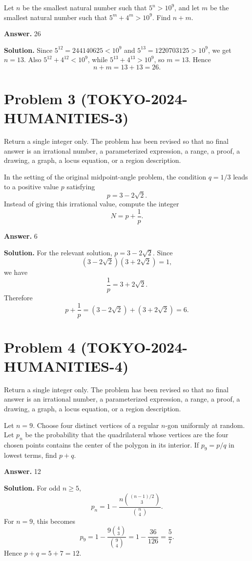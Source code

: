 \documentclass[11pt]{article}
\begin{document}
Let \(n\) be the smallest natural number such that \(5^n>10^9\), and let \(m\)
be the smallest natural number such that \(5^m+4^m>10^9\). Find \(n+m\).


\textbf{Answer.} 26


\textbf{Solution.}
Since \(5^{12}=244140625<10^9\) and \(5^{13}=1220703125>10^9\), we get
\(n=13\). Also \(5^{12}+4^{12}<10^9\), while \(5^{13}+4^{13}>10^9\), so
\(m=13\). Hence
\[
n+m=13+13=26.
\]


\section*{Problem 3 (TOKYO-2024-HUMANITIES-3)}

Return a single integer only. The problem has been revised so that no final answer is an irrational number, a parameterized expression, a range, a proof, a drawing, a graph, a locus equation, or a region description.

In the setting of the original midpoint-angle problem, the condition \(q=1/3\)
leads to a positive value \(p\) satisfying
\[
p=3-2\sqrt2.
\]
Instead of giving this irrational value, compute the integer
\[
N=p+\frac1p.
\]


\textbf{Answer.} 6


\textbf{Solution.}
For the relevant solution, \(p=3-2\sqrt2\). Since
\[
(3-2\sqrt2)(3+2\sqrt2)=1,
\]
we have
\[
\frac1p=3+2\sqrt2.
\]
Therefore
\[
p+\frac1p=(3-2\sqrt2)+(3+2\sqrt2)=6.
\]


\section*{Problem 4 (TOKYO-2024-HUMANITIES-4)}

Return a single integer only. The problem has been revised so that no final answer is an irrational number, a parameterized expression, a range, a proof, a drawing, a graph, a locus equation, or a region description.

Let \(n=9\). Choose four distinct vertices of a regular \(n\)-gon uniformly at
random. Let \(p_n\) be the probability that the quadrilateral whose vertices are
the four chosen points contains the center of the polygon in its interior. If
\(p_9=p/q\) in lowest terms, find \(p+q\).


\textbf{Answer.} 12


\textbf{Solution.}
For odd \(n\ge5\),
\[
p_n=1-\frac{n\binom{(n-1)/2}{3}}{\binom n4}.
\]
For \(n=9\), this becomes
\[
p_9=1-\frac{9\binom43}{\binom94}
=1-\frac{36}{126}=\frac57.
\]
Hence \(p+q=5+7=12\).
\end{document}
